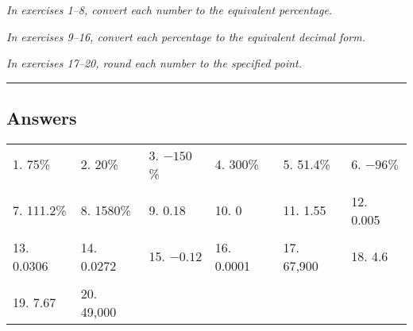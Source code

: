 \begin{exercises}
\textit{In exercises 1--8, convert each number to the equivalent percentage.}



\textit{In exercises 9--16, convert each percentage to the equivalent decimal form.}



\textit{In exercises 17--20, round each number to the specified point.}


\vspace*{0.25in}

{\color{blue!60!black} \rule{\textwidth}{3pt}}
\vspace*{0.25in}

\subsection{Answers}
\begin{tabularx}{\textwidth}{l l l l l l}
1. 75\% & 2. 20\% & 3. $-150$\% & 4. 300\% & 5. 51.4\% & 6. $-96\%$\\ \\
7. 111.2\% & 8. 1580\% & 9. 0.18 & 10. 0 & 11. 1.55 & 12. 0.005\\ \\
13. 0.0306 & 14. 0.0272 & 15. $-0.12$ & 16. 0.0001 & 17. 67,900 & 18. 4.6\\ \\
19. 7.67 & 20. 49,000
\end{tabularx}
\end{exercises}
